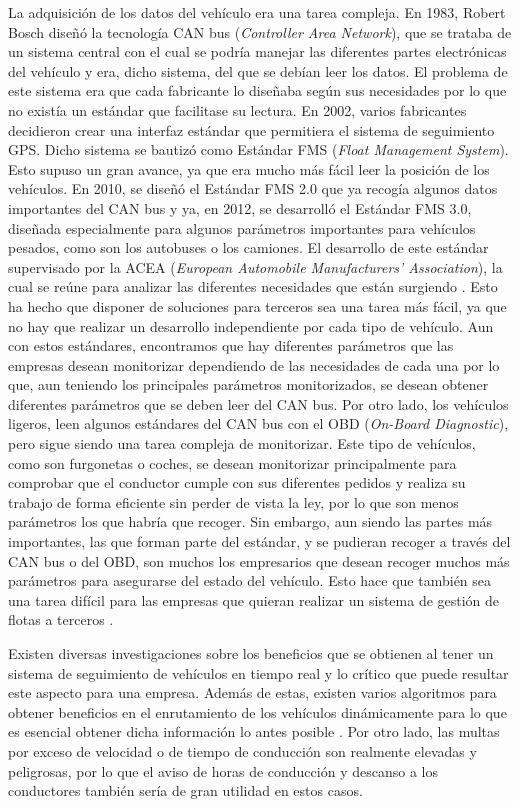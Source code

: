 La adquisición de los datos del vehículo era una tarea compleja. En 1983, Robert Bosch diseñó la tecnología CAN bus (\emph{Controller Area Network}), que se trataba de un sistema central con el cual se podría manejar las diferentes partes electrónicas del vehículo y era, dicho sistema, del que se debían leer los datos. El problema de este sistema era que cada fabricante lo diseñaba según sus necesidades por lo que no existía un estándar que facilitase su lectura. En 2002, varios fabricantes decidieron crear una interfaz estándar que permitiera el sistema de seguimiento GPS. Dicho sistema se bautizó como Estándar FMS (\emph{Float Management System}). Esto supuso un gran avance, ya que era mucho más fácil leer la posición de los vehículos. En 2010, se diseñó el Estándar FMS 2.0 que ya recogía algunos datos importantes del CAN bus y ya, en 2012, se desarrolló el Estándar FMS 3.0, diseñada especialmente para algunos parámetros importantes para vehículos pesados, como son los autobuses o los camiones. El desarrollo de este estándar supervisado por la ACEA (\emph{European Automobile Manufacturers’ Association}), la cual se reúne para analizar las diferentes necesidades que están surgiendo \cite{2-1}. Esto ha hecho que disponer de soluciones para terceros sea una tarea más fácil, ya que no hay que realizar un desarrollo independiente por cada tipo de vehículo. Aun con estos estándares, encontramos que hay diferentes parámetros que las empresas desean monitorizar dependiendo de las necesidades de cada una por lo que, aun teniendo los principales parámetros monitorizados, se desean obtener diferentes parámetros que se deben leer del CAN bus. Por otro lado, los vehículos ligeros, leen algunos estándares del CAN bus con el OBD (\emph{On-Board Diagnostic}), pero sigue siendo una tarea compleja de monitorizar. Este tipo de vehículos, como son furgonetas o coches, se desean monitorizar principalmente para comprobar que el conductor cumple con sus diferentes pedidos y realiza su trabajo de forma eficiente sin perder de vista la ley, por lo que son menos parámetros los que habría que recoger. Sin embargo, aun siendo las partes más importantes, las que forman parte del estándar, y se pudieran recoger a través del CAN bus o del OBD, son muchos los empresarios que desean recoger muchos más parámetros para asegurarse del estado del vehículo. Esto hace que también sea una tarea difícil para las empresas que quieran realizar un sistema de gestión de flotas a terceros \cite{2-2}.\par

Existen diversas investigaciones sobre los beneficios que se obtienen al tener un sistema de seguimiento de vehículos en tiempo real y lo crítico que puede resultar este aspecto para una empresa. Además de estas, existen varios algoritmos para obtener beneficios en el enrutamiento de los vehículos dinámicamente para lo que es esencial obtener dicha información lo antes posible \cite{1-1-4}. Por otro lado, las multas por exceso de velocidad \cite{1-1-5} o de tiempo de conducción \cite{1-1-6} son realmente elevadas y peligrosas, por lo que el aviso de horas de conducción y descanso a los conductores también sería de gran utilidad en estos casos.\par

